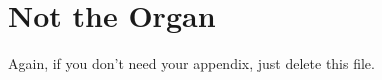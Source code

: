 \chapter{Not the Organ}\label{ch:not-the-organ}

Again, if you don't need your appendix, just delete this file.
